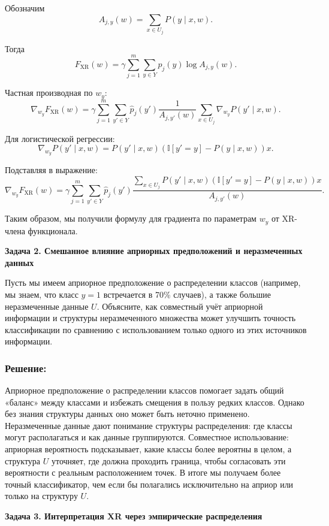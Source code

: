 Обозначим
\[
    A_{j,y}(w) = \sum_{x \in U_j} P(y \mid x,w).
\]

Тогда
\[
    F_{\text{XR}}(w) = \gamma \sum_{j=1}^m \sum_{y \in Y} \hat{p}_j(y) \log A_{j,y}(w).
\]

Частная производная по $w_y$:
\[
    \nabla_{w_y} F_{\text{XR}}(w) = \gamma \sum_{j=1}^m \sum_{y' \in Y} \hat{p}_j(y') \frac{1}{A_{j,y'}(w)} \sum_{x \in U_j} \nabla_{w_y}P(y' \mid x,w).
\]

Для логистической регрессии:
\[
    \nabla_{w_y}P(y' \mid x,w) = P(y' \mid x,w)(\mathbb{I}[y'=y]-P(y \mid x,w))x.
\]

Подставляя в выражение:
\[
    \nabla_{w_y} F_{\text{XR}}(w) = \gamma \sum_{j=1}^m \sum_{y' \in Y} \hat{p}_j(y') \frac{\sum_{x \in U_j} P(y' \mid x,w)(\mathbb{I}[y'=y]-P(y \mid x,w))x}{A_{j,y'}(w)}.
\]

Таким образом, мы получили формулу для градиента по параметрам $w_y$ от XR-члена функционала.

\bigskip

\noindent\textbf{Задача 2. Смешанное влияние априорных предположений и неразмеченных данных}

Пусть мы имеем априорное предположение о распределении классов (например, мы знаем, что класс $y=1$ встречается в 70\% случаев), а также большие неразмеченные данные $U$. Объясните, как совместный учёт априорной информации и структуры неразмеченного множества может улучшить точность классификации по сравнению с использованием только одного из этих источников информации.

\subsubsection*{Решение:}
Априорное предположение о распределении классов помогает задать общий «баланс» между классами и избежать смещения в пользу редких классов. Однако без знания структуры данных оно может быть неточно применено. Неразмеченные данные дают понимание структуры распределения: где классы могут располагаться и как данные группируются. Совместное использование: априорная вероятность подсказывает, какие классы более вероятны в целом, а структура $U$ уточняет, где должна проходить граница, чтобы согласовать эти вероятности с реальным расположением точек. В итоге мы получаем более точный классификатор, чем если бы полагались исключительно на априор или только на структуру $U$.

\bigskip

\noindent\textbf{Задача 3. Интерпретация XR через эмпирические распределения}

